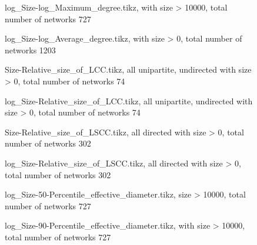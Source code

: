 \documentclass[fleqn]{article}
\begin{document}
	\begin{figure}[!htb]
		\centering
		
		\caption{log\_Size-log\_Maximum\_degree.tikz, with size > 10000, total number of networks 727}
	\end{figure}
	
	\begin{figure}[!htb]
		\centering
		
		\caption{log\_Size-log\_Average\_degree.tikz, with size > 0, total number of networks 1203}
	\end{figure}

	\begin{figure}[!htb]
		\centering
		
		\caption{Size-Relative\_size\_of\_LCC.tikz, all unipartite, undirected with size > 0, total number of networks 74}
	\end{figure}

	\begin{figure}[!htb]
		\centering
		
		\caption{log\_Size-Relative\_size\_of\_LCC.tikz, all unipartite, undirected with size > 0, total number of networks 74}
	\end{figure}

	\begin{figure}[!htb]
		\centering
		
		\caption{Size-Relative\_size\_of\_LSCC.tikz, all directed with size > 0, total number of networks 302}
	\end{figure}


	\begin{figure}[!htb]
		\centering
		
		\caption{log\_Size-Relative\_size\_of\_LSCC.tikz,  all directed with size > 0, total number of networks 302}
	\end{figure}

	\begin{figure}[!htb]
		\centering
		
		\caption{log\_Size-50-Percentile\_effective\_diameter.tikz, size > 10000, total number of networks 727}
	\end{figure}

	\begin{figure}[!htb]
		\centering
		
		\caption{log\_Size-90-Percentile\_effective\_diameter.tikz, with size > 10000, total number of networks 727}
	\end{figure}
	
\end{document}
